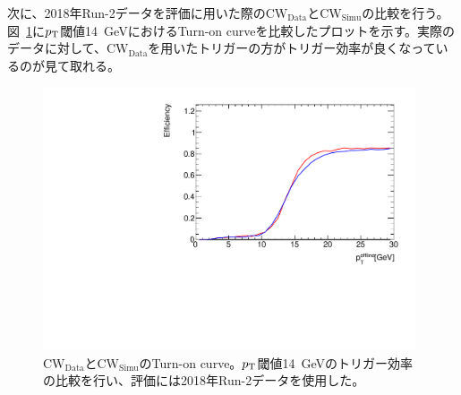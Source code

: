次に、2018年Run-2データを評価に用いた際の$\mathrm{CW_{Data}}$と$\mathrm{CW_{Simu}}$の比較を行う。図~\ref{fig:v06v07}に$p_{\rm{T}}$閾値14~GeVにおけるTurn-on curveを比較したプロットを示す。実際のデータに対して、$\mathrm{CW_{Data}}$を用いたトリガーの方がトリガー効率が良くなっているのが見て取れる。
\begin{figure}[tb]
  \centering
  \includegraphics[clip, width=11cm]{fig/4/v06vsv07_MU14.pdf}
  \caption{$\mathrm{CW_{Data}}$と$\mathrm{CW_{Simu}}$のTurn-on curve。$p_{\rm{T}}$閾値14~GeVのトリガー効率の比較を行い、評価には2018年Run-2データを使用した。}
  \label{fig:v06v07}
\end{figure}



